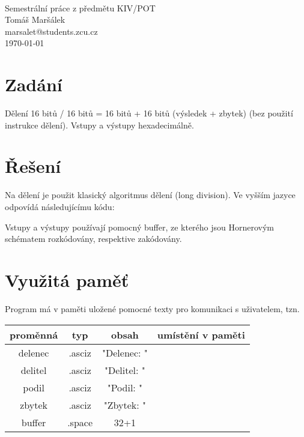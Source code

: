 \documentclass[11pt]{article}
\begin{document}
\begin{titlepage}
\begin{center}
	\mbox{} \\[3cm]
	\huge{Semestrální práce z předmětu KIV/POT} \\[2.5cm]
	\Large{Tomáš Maršálek} \\
	\large{marsalet@students.zcu.cz} \\[1cm]
	\normalsize{\today}
\end{center}
\thispagestyle{empty}
\end{titlepage}

\section{Zadání}
Dělení 16 bitů / 16 bitů = 16 bitů + 16 bitů (výsledek + zbytek) (bez použití
instrukce dělení). Vstupy a výstupy hexadecimálně.

\section{Řešení}
Na dělení je použit klasický algoritmus dělení (long division). Ve vyšším
jazyce odpovídá následujícímu kódu:

Vstupy a výstupy používají pomocný buffer, ze kterého jsou Hornerovým schématem
rozkódovány, respektive zakódovány.

\section{Využitá paměť}
Program má v paměti uložené pomocné texty pro komunikaci s uživatelem, tzn. 
\begin{tabular}{|c|c|c|c|}
\hline
proměnná & typ & obsah & umístění v paměti \\
\hline
delenec  & .asciz & "Delenec:  " & \\
delitel  & .asciz & "Delitel:  " & \\
podil    & .asciz & "Podil:    " & \\
zbytek   & .asciz & "Zbytek:   " & \\
buffer   & .space & 32+1 \\
\hline
\end{tabular}
\end{document}
